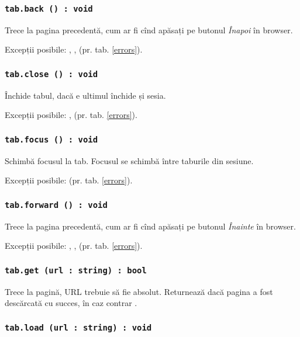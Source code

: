 \subsubsection{\texttt{tab.back () : void}}

Trece la pagina precedentă, cum ar fi cînd apăsați pe butonul \textit{Înapoi} în browser.

Excepții posibile: , ,  (pr. tab. \ref{errors}).

\subsubsection{\texttt{tab.close () : void}}

Închide tabul, dacă e ultimul închide și sesia.

Excepții posibile: ,  (pr. tab. \ref{errors}).

\subsubsection{\texttt{tab.focus () : void}}

Schimbă focusul la tab. Focusul se schimbă între taburile din sesiune.

Excepții posibile:  (pr. tab. \ref{errors}).

\subsubsection{\texttt{tab.forward () : void}}

Trece la pagina precedentă, cum ar fi cînd apăsați pe butonul \textit{Înainte} în browser.


Excepții posibile: , ,  (pr. tab. \ref{errors}).

\subsubsection{\texttt{tab.get (url : string) : bool}}

Trece la pagină, URL trebuie să fie absolut. Returnează \true{} dacă pagina a fost descărcată cu succes, în caz contrar \false.

\subsubsection{\texttt{tab.load (url : string) : void}}


